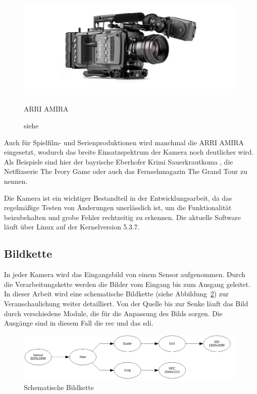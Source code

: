 \begin{figure}[!hbtp]
	\centering
	\includegraphics[width = 0.7\linewidth]{pictures/amira-product-image-data.jpg}
	\hspace*{0\textwidth}
	\caption{ARRI AMIRA}
	\caption*{siehe \cite{arriamira_bild}}
	\label{fig:amira}
\end{figure}  

Auch für Spielfilm- und Serienproduktionen wird  manchmal die \ac{ARRI} AMIRA eingesetzt, wodurch das breite Einsatzspektrum der Kamera noch deutlicher wird.
Als Beispiele sind hier der bayrische Eberhofer Krimi \glqq Sauerkrautkoma\grqq{} \cite{arrikrimi}, die Netflixserie \glqq The Ivory Game\grqq{} \cite{imdbivory} oder auch das Fernsehmagazin \glqq The Grand Tour\grqq{} \cite{imdbtour} zu nennen.
 
Die Kamera ist ein wichtiger Bestandteil in der Entwicklungsarbeit, da das regelmäßige Testen von Änderungen unerlässlich ist, um die Funktionalität beizubehalten und grobe Fehler rechtzeitig zu erkennen. Die aktuelle Software läuft über Linux auf der Kernelversion 5.3.7.

\subsection{Bildkette}\label{sec:bildkette}
In jeder Kamera wird das Eingangsbild von einem Sensor aufgenommen. Durch die Verarbeitungskette werden die Bilder vom Eingang bis zum Ausgang geleitet. In dieser Arbeit wird eine schematische Bildkette (siehe Abbildung~\ref{fig:bild}) zur Veranschaulichung weiter detailliert. Von der Quelle bis zur Senke läuft das Bild durch verschiedene Module, die für die Anpassung des Bilds sorgen. Die Ausgänge sind in diesem Fall die \ac{rec} und das \ac{sdi}.

\begin{figure}[!hbtp]
	\centering
	\includegraphics[width = \linewidth]{pictures/2019-11-17_Bildkette.png}
	\smallskip
	\caption{Schematische Bildkette}
	\label{fig:bild}
\end{figure} 

